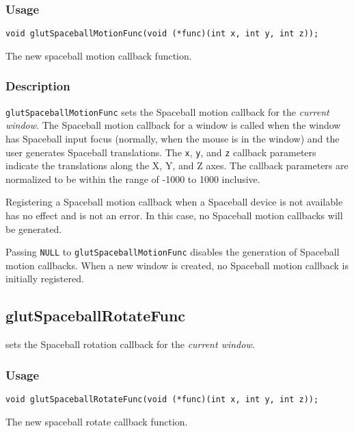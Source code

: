 \subsubsection*{Usage}
\begin{verbatim}
void glutSpaceballMotionFunc(void (*func)(int x, int y, int z));
\end{verbatim}
\begin{description}
\itemsep 0in
\item[{\tt func}]
The new spaceball motion callback function.
\end{description}

\subsubsection*{Description}

{\tt glutSpaceballMotionFunc} sets the Spaceball motion callback for the {\em
current window}.  The Spaceball motion callback for a window is called when the
window has Spaceball input focus (normally, when the mouse is in the window)
and the user generates Spaceball translations.  The {\tt x}, {\tt y}, and {\tt z}
callback parameters indicate the translations along the X, Y, and Z axes.
The callback parameters are normalized to be within the range of -1000 to 1000
inclusive.

Registering a Spaceball motion callback when a Spaceball device is not available
has no effect and is not an error.  In this case, no Spaceball motion callbacks
will be generated.

Passing {\tt NULL} to {\tt glutSpaceballMotionFunc} disables the generation of
Spaceball motion callbacks.  When a new window is created, no
Spaceball motion callback is initially registered.

\subsection{glutSpaceballRotateFunc}

 sets the Spaceball rotation callback
for the {\em current window}.

\subsubsection*{Usage}
\begin{verbatim}
void glutSpaceballRotateFunc(void (*func)(int x, int y, int z));
\end{verbatim}
\begin{description}
\itemsep 0in
\item[{\tt func}]
The new spaceball rotate callback function.
\end{description}

